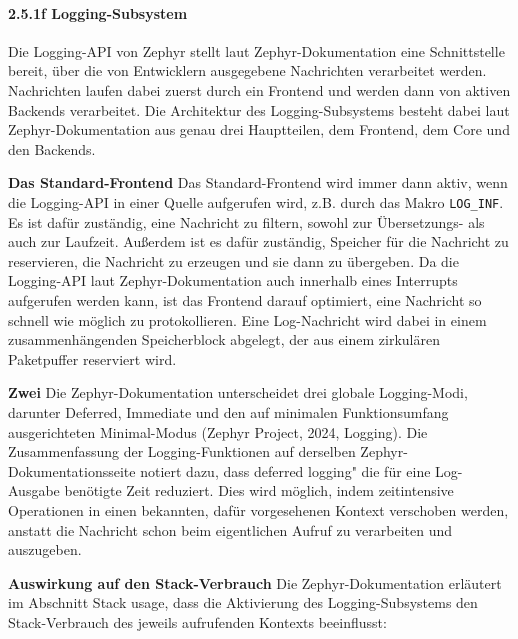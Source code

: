 \paragraph*{\textbf{2.5.1f Logging-Subsystem}}
Die Logging-API von Zephyr stellt laut Zephyr-Dokumentation eine Schnittstelle bereit, {\"u}ber die von Entwicklern ausgegebene Nachrichten verarbeitet werden. Nachrichten laufen dabei zuerst durch ein Frontend und werden dann von aktiven Backends verarbeitet. Die Architektur des Logging-Subsystems besteht dabei laut Zephyr-Dokumentation aus genau drei Hauptteilen, dem Frontend, dem Core und den Backends.

\textbf{Das Standard-Frontend} Das Standard-Frontend wird immer dann aktiv, wenn die Logging-API in einer Quelle aufgerufen wird, z.B. durch das Makro \lstinline[style=fileinline]|LOG_INF|. Es ist daf{\"u}r zust{\"a}ndig, eine Nachricht zu filtern, sowohl zur {\"U}bersetzungs- als auch zur Laufzeit. Au{\ss}erdem ist es daf{\"u}r zust{\"a}ndig, Speicher f{\"u}r die Nachricht zu reservieren, die Nachricht zu erzeugen und sie dann zu {\"u}bergeben. Da die Logging-API laut Zephyr-Dokumentation auch innerhalb eines Interrupts aufgerufen werden kann, ist das Frontend darauf optimiert, eine Nachricht so schnell wie m{\"o}glich zu protokollieren. Eine Log-Nachricht wird dabei in einem zusammenh{\"a}ngenden Speicherblock abgelegt, der aus einem \glqq{}zirkul{\"a}ren Paketpuffer\grqq{} reserviert wird.

\textbf{Zwei }Die Zephyr-Dokumentation unterscheidet drei globale Logging-Modi, darunter Deferred, Immediate und den auf minimalen Funktionsumfang ausgerichteten Minimal-Modus (Zephyr Project, 2024, \glqq{}Logging\grqq{}). Die Zusammenfassung der Logging-Funktionen auf derselben Zephyr-Dokumentationsseite notiert dazu, dass \glqq{}deferred logging" die f{\"u}r eine Log-Ausgabe ben{\"o}tigte Zeit reduziert. Dies wird m{\"o}glich, indem zeitintensive Operationen in einen bekannten, daf{\"u}r vorgesehenen Kontext verschoben werden, anstatt die Nachricht schon beim eigentlichen Aufruf zu verarbeiten und auszugeben.

\textbf{Auswirkung auf den Stack-Verbrauch} Die Zephyr-Dokumentation erl{\"a}utert im Abschnitt \glqq{}Stack usage\grqq{}, dass die Aktivierung des Logging-Subsystems den Stack-Verbrauch des jeweils aufrufenden Kontexts beeinflusst:

